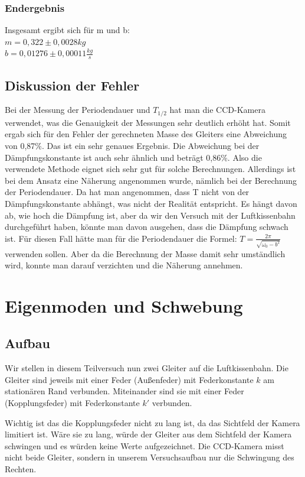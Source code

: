 \documentclass{article}
\begin{document}
          \subsubsection{Endergebnis}
              Insgesamt ergibt sich für m und b:\\
              $m=0,322\pm0,0028kg$\\
              $b= 0,01276\pm 0,00011 \frac{kg}{s}$
      \subsection{Diskussion der Fehler}
          Bei der Messung der Periodendauer und $T_{1/2}$ hat man die CCD-Kamera verwendet, was die Genauigkeit der Messungen sehr deutlich erhöht hat. Somit ergab sich für den Fehler der gerechneten Masse des Gleiters eine Abweichung von 0,87\%. Das ist ein sehr genaues Ergebnis. Die Abweichung bei der Dämpfungskonstante ist auch sehr ähnlich und beträgt 0,86\%. Also die verwendete Methode eignet sich sehr gut für solche Berechnungen. Allerdings ist bei dem Ansatz eine Näherung angenommen wurde, nämlich bei der Berechnung der Periodendauer. Da hat man angenommen, dass T nicht von der Dämpfungskonstante abhängt, was nicht der Realität entspricht. Es hängt davon ab, wie hoch die Dämpfung ist, aber da wir den Versuch mit der Luftkissenbahn durchgeführt haben, könnte man davon ausgehen, dass die Dämpfung schwach ist. Für diesen Fall hätte man für die Periodendauer die Formel: $T=\frac{2\pi}{\sqrt{\omega_0-b^2}}$ verwenden sollen.
          Aber da die Berechnung der Masse damit sehr umständlich wird, konnte man darauf verzichten und die Näherung annehmen.

    \section{Eigenmoden und Schwebung}

      \subsection{Aufbau}
          Wir stellen in diesem Teilversuch nun zwei Gleiter auf die Luftkissenbahn.
          Die Gleiter sind jeweils mit einer Feder (Außenfeder) mit Federkonstante \(k\) am stationären Rand verbunden.
          Miteinander sind sie mit einer Feder (Kopplungsfeder) mit Federkonstante \(k'\) verbunden.

          Wichtig ist das die Kopplungsfeder nicht zu lang ist, da das Sichtfeld der Kamera limitiert ist.
          Wäre sie zu lang, würde der Gleiter aus dem Sichtfeld der Kamera schwingen und es würden keine Werte aufgezeichnet.
          Die CCD-Kamera misst nicht beide Gleiter, sondern in unserem Versuchsaufbau nur die Schwingung des Rechten.
\end{document}
